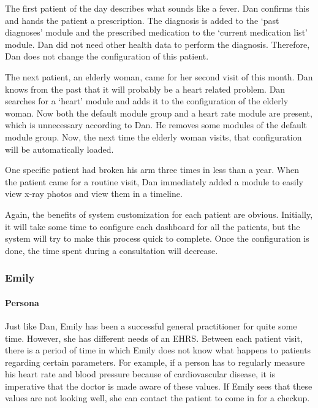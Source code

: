         The first patient of the day describes what sounds like a fever. Dan confirms this and hands the patient a prescription. The diagnosis is added to the `past diagnoses' module and the prescribed medication to the `current medication list' module. Dan did not need other health data to perform the diagnosis. Therefore, Dan does not change the configuration of this patient.

        The next patient, an elderly woman, came for her second visit of this month. Dan knows from the past that it will probably be a heart related problem. Dan searches for a `heart' module and adds it to the configuration of the elderly woman. Now both the default module group and a heart rate module are present, which is unnecessary according to Dan. He removes some modules of the default module group. Now, the next time the elderly woman visits, that configuration will be automatically loaded.

        One specific patient had broken his arm three times in less than a year. When the patient came for a routine visit, Dan immediately added a module to easily view x-ray photos and view them in a timeline.\bigskip

        \noindent Again, the benefits of system customization for each patient are obvious. Initially, it will take some time to configure each dashboard for all the patients, but the system will try to make this process quick to complete. Once the configuration is done, the time spent during a consultation will decrease.
        
        \subsubsection{Emily}

        \paragraph{Persona} Just like Dan, Emily has been a successful general practitioner for quite some time. However, she has different needs of an EHRS\@. Between each patient visit, there is a period of time in which Emily does not know what happens to patients regarding certain parameters. For example, if a person has to regularly measure his heart rate and blood pressure because of cardiovascular disease, it is imperative that the doctor is made aware of these values. If Emily sees that these values are not looking well, she can contact the patient to come in for a checkup.

